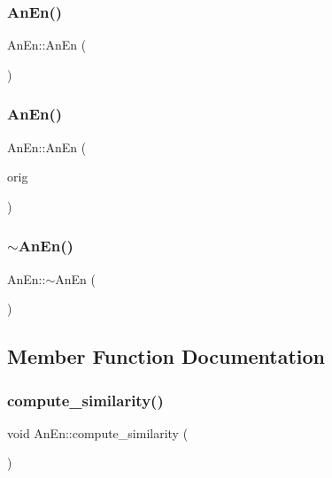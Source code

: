 \subsubsection{\texorpdfstring{An\+En()}{AnEn()}\hspace{0.1cm}{\footnotesize\ttfamily [1/2]}}
{\footnotesize\ttfamily An\+En\+::\+An\+En (\begin{DoxyParamCaption}{ }\end{DoxyParamCaption})}

\mbox{\label{class_an_en_a7fed6ed88ade22211fd75028a3a9491e}} 
\subsubsection{\texorpdfstring{An\+En()}{AnEn()}\hspace{0.1cm}{\footnotesize\ttfamily [2/2]}}
{\footnotesize\ttfamily An\+En\+::\+An\+En (\begin{DoxyParamCaption}\item[{const \mbox{\hyperlink{class_an_en}{An\+En}} \&}]{orig }\end{DoxyParamCaption})}

\mbox{\label{class_an_en_a18609907411058ee2c343727ab69bff4}} 
\subsubsection{\texorpdfstring{$\sim$\+An\+En()}{~AnEn()}}
{\footnotesize\ttfamily An\+En\+::$\sim$\+An\+En (\begin{DoxyParamCaption}{ }\end{DoxyParamCaption})\hspace{0.3cm}{\ttfamily [virtual]}}



\subsection{Member Function Documentation}
\mbox{\label{class_an_en_a474249893701af8b457633fe7df8984b}} 
\subsubsection{\texorpdfstring{compute\+\_\+similarity()}{compute\_similarity()}}
{\footnotesize\ttfamily void An\+En\+::compute\+\_\+similarity (\begin{DoxyParamCaption}{ }\end{DoxyParamCaption})}

